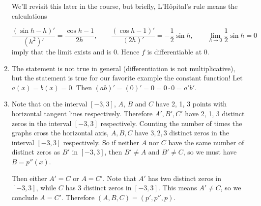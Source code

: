 \documentclass[12pt,a4paper]{article}
\newcommand{\rar}{\rightarrow}
\begin{document}
\begin{enumerate}
We'll revisit this later in the course, but briefly, L'H\^opital's rule means the calculations

\[
	\frac{(\sin h - h)'}{(h^2)'} = \frac{\cos h - 1}{2h},\qquad \frac{(\cos h - 1)'}{(2h)'} = -\frac{1}{2}\sin h, \qquad \lim_{h \rar 0}\frac{1}{2}\sin h = 0 
\] 
imply that the limit exists and is 0. Hence $f$ is differentiable at 0.
	\item The statement is not true in general (differentiation is not multiplicative), but the statement is true for our favorite example the constant function! Let $a(x) = b(x) =  0$.  Then $(ab)' = (0)' = 0 = 0 \cdot 0 = a'b'$.
	\item Note that on the interval $[-3,3]$, $A$, $B$ and $C$ have 2, 1, 3 points with horizontal tangent lines respectively. Therefore $A',B',C'$ have 2, 1, 3 distinct zeros in the interval $[-3,3]$ respectively. Counting the number of times the graphs cross the horizontal axis, $A,B,C$ have $3,2,3$ distinct zeros in the interval $[-3,3]$ respectively. So if neither $A$ nor $C$ have the same number of distinct zeros as $B'$ in $[-3,3]$, then $B' \ne A$ and $B' \ne C$, so we must have $B = p''(x)$.

Then either $A' = C$ or $A = C'$. Note that $A'$ has two distinct zeros in $[-3,3]$, while $C$ has 3 distinct zeros in $[-3,3]$. This means $A' \ne C$, so we conclude $A = C'$. Therefore $(A,B,C) = (p',p'',p)$.


\end{enumerate}
\end{document}
